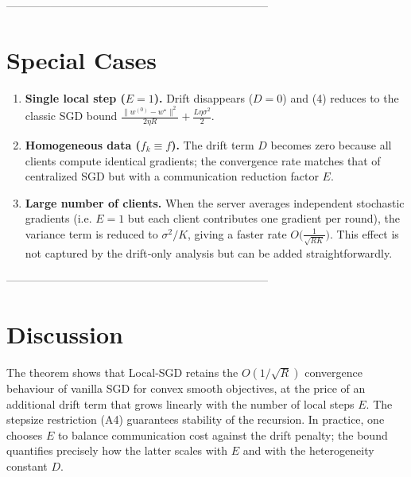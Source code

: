 \documentclass{article}
\begin{document}
-----------------------------------------------------------------------

\section*{Special Cases}
\begin{enumerate}[label=\alph*.]
\item \textbf{Single local step ($E=1$).}  
Drift disappears ($D=0$) and (4) reduces to the classic SGD bound
$\frac{\|w^{(0)}-w^\star\|^{2}}{2\eta R}+ \frac{L\eta\sigma^{2}}{2}$.

\item \textbf{Homogeneous data ($f_k\equiv f$).}  
The drift term $D$ becomes zero because all clients compute identical
gradients; the convergence rate matches that of centralized SGD but with a
communication reduction factor $E$.

\item \textbf{Large number of clients.}  
When the server averages independent stochastic gradients (i.e. $E=1$ but
each client contributes one gradient per round), the variance term is
reduced to $\sigma^{2}/K$, giving a faster rate
$O\big(\frac{1}{\sqrt{RK}}\big)$. This effect is not captured by the
drift‑only analysis but can be added straightforwardly.
\end{enumerate}

-----------------------------------------------------------------------

\section*{Discussion}
The theorem shows that Local‑SGD retains the $O(1/\sqrt{R})$ convergence
behaviour of vanilla SGD for convex smooth objectives, at the price of an
additional drift term that grows linearly with the number of local steps
$E$. The stepsize restriction (A4) guarantees stability of the recursion.
In practice, one chooses $E$ to balance communication cost against the
drift penalty; the bound quantifies precisely how the latter scales with
$E$ and with the heterogeneity constant $D$.
\end{document}
